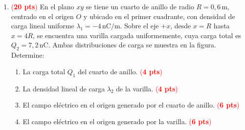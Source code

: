 \documentclass{article}
\begin{document}
\newpage
\begin{enumerate} 
 \item[3.] \textcolor{red}{(\textbf{20 pts})} En el plano $xy$ se tiene un cuarto de anillo de
 radio $R=0{,}6\,\text{m}$, centrado en el origen $O$ y ubicado en el primer cuadrante, con densidad de carga lineal uniforme
 $\lambda_1 = -4\,\text{nC/m}$.
 Sobre el eje $+x$, desde $x=R$ hasta $x=4R$, se encuentra una varilla cargada uniformemente,
 cuya carga total es $Q_2=7{,}2\,\text{nC}$.
Ambas distribuciones de carga se muestra en la figura.\\
 Determine:

\begin{minipage}{0.52\textwidth}
\begin{enumerate}[label={\alph*)}]
  \item La carga total $Q_1$ del cuarto de anillo. \textcolor{red}{(\textbf{4 pts})}
  \item La densidad lineal de carga $\lambda_2$ de la varilla. \textcolor{red}{(\textbf{4 pts})}
  \item El campo eléctrico en el origen generado por el cuarto de anillo.
        \textcolor{red}{(\textbf{6 pts})}
  \item El campo eléctrico en el origen generado por la varilla. \textcolor{red}{(\textbf{6 pts})}
\end{enumerate}
\end{minipage}
\hfill
\begin{minipage}{0.46\textwidth}
\begin{center}
\end{center}
\end{minipage}
\end{enumerate}
\end{document}
